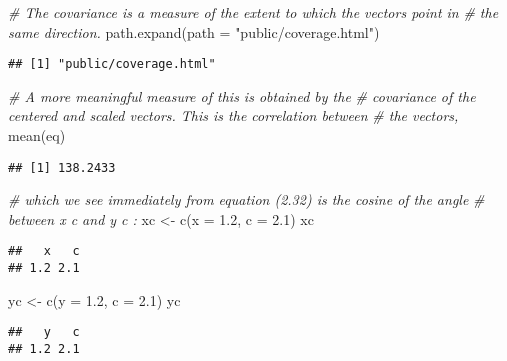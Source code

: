 \documentclass[
]{article}
\newenvironment{Shaded}{\begin{snugshade}}{\end{snugshade}}
\newcommand{\AttributeTok}[1]{\textcolor[rgb]{0.77,0.63,0.00}{#1}}
\newcommand{\CommentTok}[1]{\textcolor[rgb]{0.56,0.35,0.01}{\textit{#1}}}
\newcommand{\FloatTok}[1]{\textcolor[rgb]{0.00,0.00,0.81}{#1}}
\newcommand{\FunctionTok}[1]{\textcolor[rgb]{0.00,0.00,0.00}{#1}}
\newcommand{\NormalTok}[1]{#1}
\newcommand{\OtherTok}[1]{\textcolor[rgb]{0.56,0.35,0.01}{#1}}
\newcommand{\StringTok}[1]{\textcolor[rgb]{0.31,0.60,0.02}{#1}}
\begin{document}
\begin{Shaded}
\begin{Highlighting}[]
\CommentTok{\# The covariance is a measure of the extent to which the vectors point in}
\CommentTok{\# the same direction.}
\FunctionTok{path.expand}\NormalTok{(}\AttributeTok{path =} \StringTok{"public/coverage.html"}\NormalTok{)}
\end{Highlighting}
\end{Shaded}

\begin{verbatim}
## [1] "public/coverage.html"
\end{verbatim}

\begin{Shaded}
\begin{Highlighting}[]
\CommentTok{\# A more meaningful measure of this is obtained by the}
\CommentTok{\# covariance of the centered and scaled vectors. This is the correlation between}
\CommentTok{\# the vectors,}
\FunctionTok{mean}\NormalTok{(eq)}
\end{Highlighting}
\end{Shaded}

\begin{verbatim}
## [1] 138.2433
\end{verbatim}

\begin{Shaded}
\begin{Highlighting}[]
\CommentTok{\# which we see immediately from equation (2.32) is the cosine of the angle}
\CommentTok{\# between x c and y c :}
\NormalTok{xc }\OtherTok{\textless{}{-}} \FunctionTok{c}\NormalTok{(}\AttributeTok{x =} \FloatTok{1.2}\NormalTok{, }\AttributeTok{c =} \FloatTok{2.1}\NormalTok{)}
\NormalTok{xc}
\end{Highlighting}
\end{Shaded}

\begin{verbatim}
##   x   c 
## 1.2 2.1
\end{verbatim}

\begin{Shaded}
\begin{Highlighting}[]
\NormalTok{yc }\OtherTok{\textless{}{-}} \FunctionTok{c}\NormalTok{(}\AttributeTok{y =} \FloatTok{1.2}\NormalTok{, }\AttributeTok{c =} \FloatTok{2.1}\NormalTok{)}
\NormalTok{yc}
\end{Highlighting}
\end{Shaded}

\begin{verbatim}
##   y   c 
## 1.2 2.1
\end{verbatim}
\end{document}
